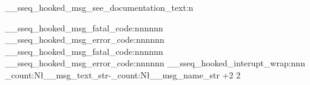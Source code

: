 \let\sseq@errmessage@std\errmessage
\def\sseq@errmessage#1{\sseq@error@setup\let\\\iow_newline:\sseq@errmessage@std{#1\sseq@error@annotation}\sseq@error@cleanup}

\pretocmd\__sseq_hooked_msg_see_documentation_text:n{\sseq@errorinfo}{}{\sseq@msgpatchfailed}


\pretocmd\__sseq_hooked_msg_fatal_code:nnnnnn  {\sseq@error@setup}  {}{\sseq@msgpatchfailed}
\pretocmd\__sseq_hooked_msg_error_code:nnnnnn  {\sseq@error@setup}  {}{\sseq@msgpatchfailed}
\apptocmd\__sseq_hooked_msg_fatal_code:nnnnnn  {\sseq@error@cleanup}{}{\sseq@msgpatchfailed}
\apptocmd\__sseq_hooked_msg_error_code:nnnnnn  {\sseq@error@cleanup}{}{\sseq@msgpatchfailed}
\patchcmd \__sseq_hooked_interupt_wrap:nnn {\str_count:N\l__msg_text_str-\str_count:N\l__msg_name_str +2} {2} {}{\sseq@msgpatchfailed}

\sseq@breakpoint






